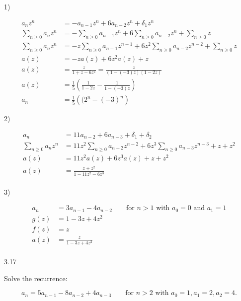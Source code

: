 \documentclass[12pt]{article}
\begin{document}
1)

\begin{equation}
\begin{aligned}
a_nz^n & = -a_{n - 1}z^n + 6a_{n - 2}z^n + \delta_1z^n \\
\sum_{n \geq 0} a_nz^n & = -\sum_{n \geq 0}a_{n-1}z^n + 6\sum_{n \geq 0}a_{n - 2}z^n + \sum_{n \geq 0}z\\
\sum_{n \geq 0} a_nz^n & = -z \sum_{n \geq 0}a_{n-1}z^{n-1} + 6z^2\sum_{n \geq 0}a_{n-2}z^{n-2} + \sum_{n \geq 0}z \\
a(z) & = -za(z) + 6z^2a(z) + z \\
a(z) & = \frac{z}{1 + z - 6z^2} = \frac{z}{(1 - (-3)z)(1 - 2z)} \\
a(z) & = \frac{1}{5}\left(\frac{1}{1 - 2z} - \frac{1}{1 - (-3)z} \right) \\
a_n & = \frac{1}{5}\left(({2^n} - (-3)^n\right) \nonumber
\end{aligned}
\end{equation}

2)

\begin{equation}
\begin{aligned}
a_n & = 11a_{n - 2} + 6a_{n - 3} + \delta_1 + \delta_2 \\
\sum_{n \geq 0} a_nz^n & = 11z^2\sum_{n \geq 0}a_{n - 2}z^{n - 2} + 6z^3\sum_{n \geq 0} a_{n - 3}z^{n - 3} + z + z^2 \\
a(z) & = 11z^2a(z) + 6z^3a(z) + z + z^2 \\
a(z) & = \frac{z + z^2}{1 - 11z^2 - 6z^3} \\
\nonumber
\end{aligned}
\end{equation}

3)

\begin{equation}
\begin{aligned}
a_n & = 3a_{n - 1} - 4a_{n - 2} \qquad \text{for ${n > 1}$ with ${a_0 = 0}$ and ${a_1 = 1}$} \\
g(z) & = 1 - 3z + 4z^2 \\
f(z) & = z \\
a(z) & = \frac{z}{1 - 3z + 4z^2} \\
\nonumber
\end{aligned}
\end{equation}

3.17

Solve the recurrence:

\begin{equation}
a_n = 5a_{n - 1} - 8a_{n - 2} + 4a_{n - 3} \qquad
\text{for ${n > 2}$ with ${a_0 = 1, a_1 = 2, a_2 = 4.}$} \nonumber
\end{equation}
\end{document}
